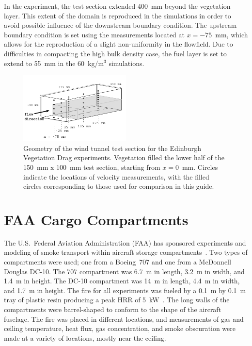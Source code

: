 In the experiment, the test section extended 400~mm beyond the vegetation layer. This extent of the domain is reproduced in the simulations in order to avoid possible influence of the downstream boundary condition. The upstream boundary condition is set using the measurements located at $x=-75$~mm, which allows for the reproduction of a slight non-uniformity in the flowfield. Due to difficulties in compacting the high bulk density case, the fuel layer is set to extend to 55~mm in the 60~kg/m$^3$ simulations.

\begin{figure}[ht]
\centering
\includegraphics[width=0.5\textwidth]{FIGURES/Edinburgh_Vegetation_Drag/domain_schematic}
\caption[Geometry of the Edinburgh Vegetation Drag experiments]{Geometry of the wind tunnel test section for the Edinburgh Vegetation Drag experiments. Vegetation filled the lower half of the 150~mm x 100~mm test section, starting from $x=0$~mm. Circles indicate the locations of velocity measurements, with the filled circles corresponding to those used for comparison in this guide.}
\label{Ed_Veg_Drag_Layout}
\end{figure}

\section{FAA Cargo Compartments}
\label{FAA_Cargo_Description}

The U.S.~Federal Aviation Administration (FAA) has sponsored experiments and modeling of smoke transport within aircraft storage compartments~\cite{FAA-AR-03-49,FAA-AR-07-27}. Two types of compartments were used; one from a Boeing~707 and one from a McDonnell Douglas DC-10. The 707 compartment was 6.7~m in length, 3.2~m in width, and 1.4~m in height. The DC-10 compartment was 14~m in length, 4.4~m in width, and 1.7~m in height. The fire for all experiments was fueled by a 0.1~m by 0.1~m tray of plastic resin producing a peak HRR of 5~kW~\cite{FAA-AR-06-21}. The long walls of the compartments were barrel-shaped to conform to the shape of the aircraft fuselage. The fire was placed in different locations, and measurements of gas and ceiling temperature, heat flux, gas concentration, and smoke obscuration were made at a variety of locations, mostly near the ceiling.


